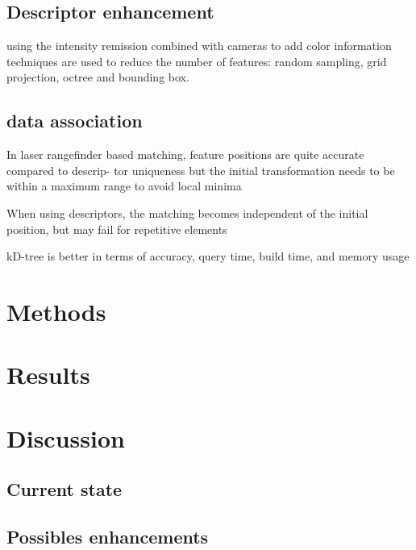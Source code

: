 \documentclass[twoside,twocolumn]{article}
\begin{document}
\subsection{Descriptor enhancement}

using the intensity remission
combined with cameras to add color information
techniques are used to reduce the number of features: random sampling, grid projection, octree and bounding box.

\subsection{data association}
In laser rangefinder based
matching, feature positions are quite accurate compared to descrip-
tor uniqueness but the initial transformation needs to be within
a maximum range to avoid local minima

When using descriptors, the
matching becomes independent of the initial position, but may fail for
repetitive elements

kD-tree is better in terms of accuracy, query time, build time,
and memory usage

\section{Methods}
\blindtext



\section{Results}
\blindtext


\section{Discussion}
\subsection{Current state}
\blindtext
\subsection{Possibles enhancements}
\blindtext

\printbibliography
\end{document}
